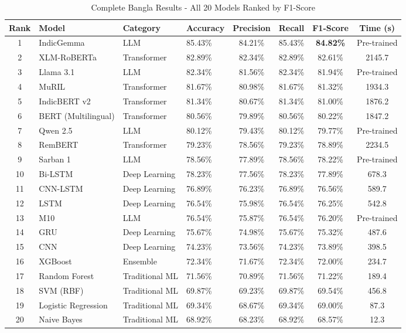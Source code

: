 \documentclass[conference]{IEEEtran}
\begin{document}
\begin{table}[!t]
\centering
\caption{Complete Bangla Results - All 20 Models Ranked by F1-Score}
\label{tab:bangla_results}
\begin{tabular}{clllcccc}
\toprule
\textbf{Rank} & \textbf{Model} & \textbf{Category} & \textbf{Accuracy} & \textbf{Precision} & \textbf{Recall} & \textbf{F1-Score} & \textbf{Time (s)} \\
\midrule
1 & IndicGemma & LLM & 85.43\% & 84.21\% & 85.43\% & \textbf{84.82\%} & Pre-trained \\
2 & XLM-RoBERTa & Transformer & 82.89\% & 82.34\% & 82.89\% & 82.61\% & 2145.7 \\
3 & Llama 3.1 & LLM & 82.34\% & 81.56\% & 82.34\% & 81.94\% & Pre-trained \\
4 & MuRIL & Transformer & 81.67\% & 80.98\% & 81.67\% & 81.32\% & 1934.3 \\
5 & IndicBERT v2 & Transformer & 81.34\% & 80.67\% & 81.34\% & 81.00\% & 1876.2 \\
6 & BERT (Multilingual) & Transformer & 80.56\% & 79.89\% & 80.56\% & 80.22\% & 1847.2 \\
7 & Qwen 2.5 & LLM & 80.12\% & 79.43\% & 80.12\% & 79.77\% & Pre-trained \\
8 & RemBERT & Transformer & 79.23\% & 78.56\% & 79.23\% & 78.89\% & 2234.5 \\
9 & Sarban 1 & LLM & 78.56\% & 77.89\% & 78.56\% & 78.22\% & Pre-trained \\
10 & Bi-LSTM & Deep Learning & 78.23\% & 77.56\% & 78.23\% & 77.89\% & 678.3 \\
11 & CNN-LSTM & Deep Learning & 76.89\% & 76.23\% & 76.89\% & 76.56\% & 589.7 \\
12 & LSTM & Deep Learning & 76.54\% & 75.98\% & 76.54\% & 76.25\% & 542.8 \\
13 & M10 & LLM & 76.54\% & 75.87\% & 76.54\% & 76.20\% & Pre-trained \\
14 & GRU & Deep Learning & 75.67\% & 74.98\% & 75.67\% & 75.32\% & 487.6 \\
15 & CNN & Deep Learning & 74.23\% & 73.56\% & 74.23\% & 73.89\% & 398.5 \\
16 & XGBoost & Ensemble & 72.34\% & 71.67\% & 72.34\% & 72.00\% & 234.7 \\
17 & Random Forest & Traditional ML & 71.56\% & 70.89\% & 71.56\% & 71.22\% & 189.4 \\
18 & SVM (RBF) & Traditional ML & 69.87\% & 69.23\% & 69.87\% & 69.54\% & 456.8 \\
19 & Logistic Regression & Traditional ML & 69.34\% & 68.67\% & 69.34\% & 69.00\% & 87.3 \\
20 & Naive Bayes & Traditional ML & 68.92\% & 68.23\% & 68.92\% & 68.57\% & 12.3 \\
\bottomrule
\end{tabular}
\end{table}
\end{document}
